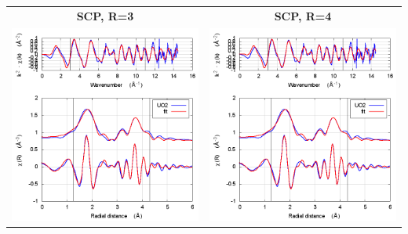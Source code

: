 \documentclass[11pt]{article}
\begin{document}
\begin{center}
  \begin{tabular}{cc}
    \textbf{SCP, R=3} & \textbf{SCP, R=4} \\ 
    \includegraphics[width=.45\linewidth]{UO2/scf/fit_withSCF_3.png} & 
    \includegraphics[width=.45\linewidth]{UO2/scf/fit_withSCF_4.png} \\
  \end{tabular}
\end{center}
\end{document}
